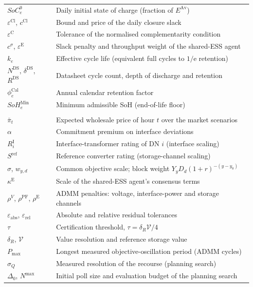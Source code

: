 \documentclass[preprint,12pt]{elsarticle}
\providecommand{\DIFaddend}{} %
\begin{document}
\begin{longtable}{@{}>{\raggedright\arraybackslash}p{} >{\raggedright\arraybackslash}p{}@{}}
        $SoC^{0}_e$ & Daily initial state of charge (fraction of $E^{\text{Av}}$) \\
        $\varepsilon^{\text{Cl}}$, $c^{\text{Cl}}$ & Bound and price of the daily closure slack \\
        $\varepsilon^{\text{C}}$ & Tolerance of the normalised complementarity condition \\
        $c^{\sigma}$, $\varepsilon^{\text{E}}$ & Slack penalty and throughput weight of the shared-ESS agent \\
        $k_e$ & Effective cycle life (equivalent full cycles to $1/\mathrm{e}$ retention) \\
        $N^{\text{DS}}$, $\delta^{\text{DS}}$, $R^{\text{DS}}$ & Datasheet cycle count, depth of discharge and retention \\
        $\phi^{\text{Cal}}_e$ & Annual calendar retention factor \\
        $SoH^{\text{Min}}_e$ & Minimum admissible SoH (end-of-life floor) \\
        \midrule
        \multicolumn{2}{@{}l}{\textbf{Coordination and certification}}\\*
        $\bar{\pi}_t$ & Expected wholesale price of hour $t$ over the market scenarios \\
        $\alpha$ & Commitment premium on interface deviations \\
        $R^{\text{I}}_i$ & Interface-transformer rating of DN $i$ (interface scaling) \\
        $S^{\text{ref}}$ & Reference converter rating (storage-channel scaling) \\
        $\sigma$, $w_{y,d}$ & Common objective scale; block weight $Y_y D_d (1+r)^{-(y-y_0)}$ \\
        $\kappa^{\text{E}}$ & Scale of the shared-ESS agent's consensus terms \\
        $\rho^{V}$, $\rho^{\text{PF}}$, $\rho^{\text{E}}$ & ADMM penalties: voltage, interface-power and storage channels \\
        $\varepsilon_{\text{abs}}$, $\varepsilon_{\text{rel}}$ & Absolute and relative residual tolerances \\
        $\tau$ & Certification threshold, $\tau = \delta_R \mathcal{V}/4$ \\
        $\delta_R$, $\mathcal{V}$ & Value resolution and reference storage value \\
        $P_{\max}$ & Longest measured objective-oscillation period (ADMM cycles) \\
        $\sigma_Q$ & Measured resolution of the recourse (planning search) \\
        $\Delta_0$, $N^{\max}$ & Initial poll size and evaluation budget of the planning search \\
    \end{longtable}
    \addtocounter{table}{-1}
\endgroup
\DIFaddend 
\end{document}
